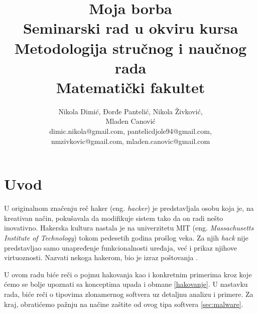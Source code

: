 \documentclass[a4paper]{article}
\begin{document}
\title{Moja borba\\ \small{Seminarski rad u okviru kursa\\Metodologija stručnog i naučnog rada\\ Matematički fakultet}}

\author{Nikola Dimić, Đorđe Pantelić, Nikola Živković,\\Mladen Canović\\ dimic.nikola@gmail.com, pantelicdjole94@gmail.com,\\nmzivkovic@gmail.com, mladen.canovic@gmail.com}


\maketitle


\setcounter{tocdepth}{2}
\tableofcontents

\newpage

\section{Uvod}
\label{sec:uvod}
U originalnom značenju reč haker (eng. \textit{hacker}) je predstavljala osobu koja je, na kreativan način, pokušavala da modifikuje sistem tako da on radi nešto inovativno. Hakerska kultura nastala je na univerzitetu MIT (eng. \textit{Massachusetts Institute of Technology}) tokom pedesetih godina prošlog veka. Za njih \textit{hack} nije predstavljao samo unapređenje funkcionalnosti uređaja, već i prikaz njihove virtuoznosti. Nazvati nekoga hakerom, bio je izraz poštovanja \cite{ethics}.

U ovom radu biće reči o pojmu hakovanja kao i konkretnim primerima kroz koje ćemo se bolje upoznati sa konceptima 
upada i obmane \ref{hakovanje}. U nastavku rada, biće reči o tipovima zlonamernog softvera uz detaljnu analizu i primere. Za kraj, obratićemo pažnju na načine zaštite od ovog tipa softvera \ref{sec:malware}.
\end{document}
